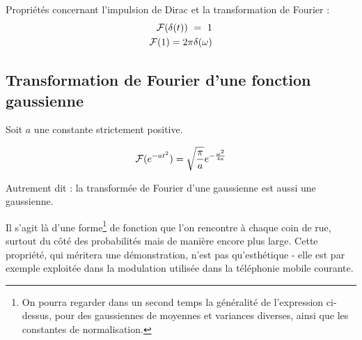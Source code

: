 Propriétés concernant l'impulsion de Dirac et la transformation de Fourier :
\begin{eqnarray}
{\cal F}(\delta(t))~=~1 \\
{\cal F}(1)=2\pi\delta(\omega) 
\end{eqnarray}




\subsection{Transformation de Fourier d'une fonction gaussienne}

Soit $a$ une constante strictement positive.

\begin{equation}
  {\cal F}(e^{-at^2})=\sqrt{\frac{\pi}{a}}e^{-\frac{\omega^2}{4a}}
\end{equation}


Autrement dit : la transformée de Fourier d'une gaussienne est aussi une gaussienne.

Il s'agit là d'une forme\footnote{On pourra regarder dans un second
temps la généralité de l'expression ci-dessus, pour des gaussiennes de
moyennes et variances diverses, ainsi que les constantes de
normalisation.}
%
 de fonction que l'on rencontre à chaque coin de rue,
surtout du côté des probabilités mais de manière encore plus
large. Cette propriété, qui méritera une démonstration, n'est pas
qu'esthétique - elle est par exemple exploitée dans la modulation
utilisée dans la téléphonie mobile courante.

